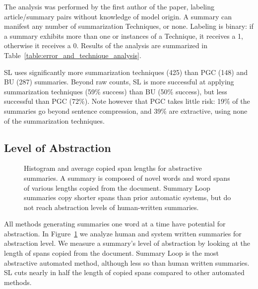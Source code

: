 \documentclass[11pt,a4paper]{article}
\begin{document}
The analysis was performed by the first author of the paper, labeling article/summary pairs without knowledge of model origin. A summary can manifest any number of summarization Techniques, or none. Labeling is binary: if a summary exhibits more than one or instances of a Technique, it receives a 1, otherwise it receives a 0. Results of the analysis are summarized in Table~\ref{table:error_and_technique_analysis}.

SL uses significantly more summarization techniques (425) than PGC (148) and BU (287) summaries. Beyond raw counts, SL is more successful at applying summarization techniques (59\% success) than BU (50\% success), but less successful than PGC (72\%). Note however that PGC takes little risk: 19\% of the summaries go beyond sentence compression, and 39\% are extractive, using none of the summarization techniques.

\subsection{Level of Abstraction}
\begin{figure}[t]
    \centering
    
    \caption{Histogram and average copied span lengths for abstractive summaries. A summary is composed of novel words and word spans of various lengths copied from the document. Summary Loop summaries copy shorter spans than prior automatic systems, but do not reach abstraction levels of human-written summaries.}
    \label{table:abstraction_analysis}
\end{figure}

All methods generating summaries one word at a time have potential for abstraction. In Figure~\ref{table:abstraction_analysis} we analyze human and system written summaries for abstraction level. We measure  a summary's level of abstraction by looking at the length of spans copied from the document. Summary Loop is the most abstractive automated method, although less so than human written summaries.  SL cuts nearly in half the length of copied spans compared to other automated methods.
\end{document}
